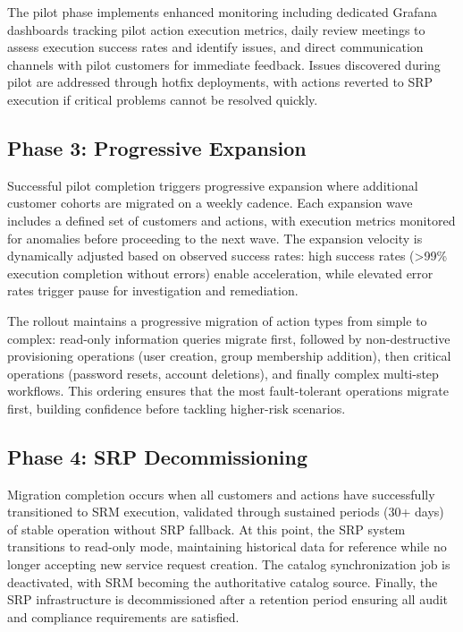 The pilot phase implements enhanced monitoring including dedicated Grafana dashboards tracking pilot action execution metrics, daily review meetings to assess execution success rates and identify issues, and direct communication channels with pilot customers for immediate feedback. Issues discovered during pilot are addressed through hotfix deployments, with actions reverted to SRP execution if critical problems cannot be resolved quickly.

\subsection{Phase 3: Progressive Expansion}

Successful pilot completion triggers progressive expansion where additional customer cohorts are migrated on a weekly cadence. Each expansion wave includes a defined set of customers and actions, with execution metrics monitored for anomalies before proceeding to the next wave. The expansion velocity is dynamically adjusted based on observed success rates: high success rates (>99\% execution completion without errors) enable acceleration, while elevated error rates trigger pause for investigation and remediation.

The rollout maintains a progressive migration of action types from simple to complex: read-only information queries migrate first, followed by non-destructive provisioning operations (user creation, group membership addition), then critical operations (password resets, account deletions), and finally complex multi-step workflows. This ordering ensures that the most fault-tolerant operations migrate first, building confidence before tackling higher-risk scenarios.

\subsection{Phase 4: SRP Decommissioning}

Migration completion occurs when all customers and actions have successfully transitioned to SRM execution, validated through sustained periods (30+ days) of stable operation without SRP fallback. At this point, the SRP system transitions to read-only mode, maintaining historical data for reference while no longer accepting new service request creation. The catalog synchronization job is deactivated, with SRM becoming the authoritative catalog source. Finally, the SRP infrastructure is decommissioned after a retention period ensuring all audit and compliance requirements are satisfied.

